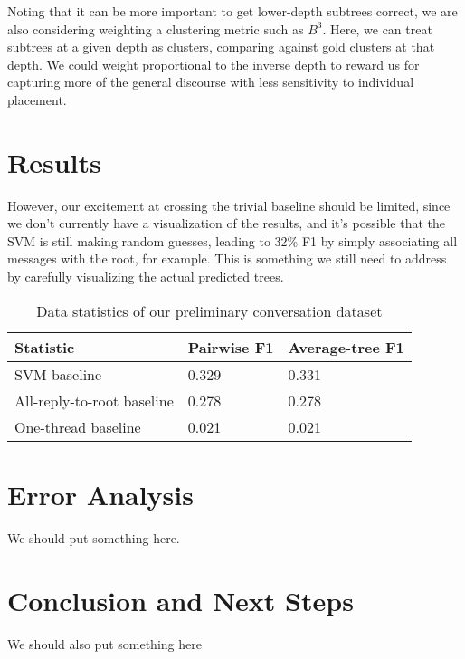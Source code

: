 \documentclass[10pt]{article}
\begin{document}
Noting that it can be more important to get lower-depth subtrees correct, we
are also considering weighting a clustering metric such as $B^3$. Here, we 
can treat subtrees at a given depth as clusters, comparing against gold 
clusters at that depth. We could weight proportional to the inverse depth to 
reward us for capturing more of the general discourse with less sensitivity 
to individual placement.

\section{Results}
\label{sec:classifier}
However, our excitement at crossing the trivial baseline should be limited,
since we don't currently have a visualization of the results, and it's
possible that the SVM is still making random guesses, leading to 32\% F1 by
simply associating all messages with the root, for example. This is something
we still need to address by carefully visualizing the actual predicted trees.

\begin{table}[h]\footnotesize
 \begin{tabular}{| l | l | l |} 
   \hline
   \textbf{Statistic} & Pairwise F1 & Average-tree F1 \\
   \hline
    SVM baseline & 0.329 & 0.331 \\
    All-reply-to-root baseline & 0.278 & 0.278 \\
    One-thread baseline & 0.021 & 0.021 \\
   \hline
  \end{tabular}
  \caption{Data statistics of our preliminary conversation dataset}
  \label{table:results}
\end{table}

\section{Error Analysis}
We should put something here.

\section{Conclusion and Next Steps}
We should also put something here

{} 

\end{document}
